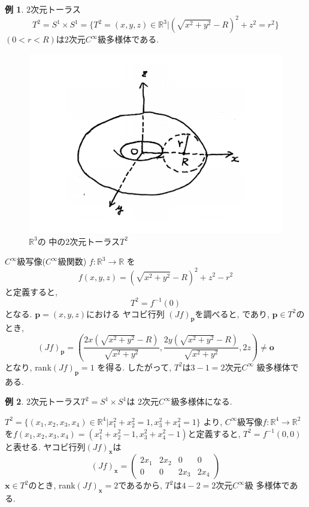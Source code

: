 \documentclass[dvipdfmx,cjk]{beamer}
\theoremstyle{definition}
\newtheorem{ex}{\textbf{ 例 }}
\begin{document}
\begin{frame}
  \frametitle{}
  \begin{ex}
    $2$次元トーラス
    $$T^2=S^1\times S^1=
    \{T^2=(x,y,z)\in \mathbb{R}^3|
    (\sqrt{x^2+y^2}-R)^2+z^2=r^2\} $$
    $(0<r<R)$は$2$次元$C^\infty$級多様体である. 
    \begin{figure}[H]
      \centering
      \includegraphics[keepaspectratio, scale=0.2]{T2Noshadow.pdf}
      \caption{$\mathbb{R}^3$の
      中の$2$次元トーラス$T^2$}
      \label{T2Noshadow}
     \end{figure}
\end{ex}
\end{frame}

\begin{frame}
    $C^\infty$級写像($C^\infty$級関数)
    $f:\mathbb{R}^3\to \mathbb{R}$
    を
    $$f(x,y,z)=(\sqrt{x^2+y^2}-R)^2+z^2-r^2$$
    と定義すると, 
    $$T^2=f^{-1}(0)$$
    となる. $\boldsymbol{p}=(x,y,z)$における
    ヤコビ行列
    $(Jf)_{\boldsymbol{p}}$を調べると, 
    であり, $\boldsymbol{p}\in T^2$のとき, 
    $$(Jf)_{\boldsymbol{p}}=
    \left(\frac{2x(\sqrt{x^2+y^2}-R)}
        {\sqrt{x^2+y^2}},\frac{2y(\sqrt{x^2+y^2}-R)}
        {\sqrt{x^2+y^2}},2z\right)\neq 
        \boldsymbol{o}$$
    となり, rank$(Jf)_{\boldsymbol{p}}=1$
    を得る. 
    したがって, $T^2$は$3-1=2$次元$C^\infty$
    級多様体である. 
\end{frame}

\begin{frame}
  \begin{ex}
    $2$次元トーラス$T^2=S^1\times S^1$は
    $2$次元$C^\infty$級多様体になる.  
  \end{ex}  
  $T^2=\{(x_1,x_2,x_3,x_4)\in \mathbb{R}^4|
  x_1^2+x_2^2=1, x_3^2+x_4^2=1\}$
  より, 
  $C^\infty$級写像$f:\mathbb{R}^4\to \mathbb{R}^2$
  を$f(x_1,x_2,x_3,x_4)=(x_1^2+x_2^2-1,
  x_3^2+x_4^2-1)$と定義すると, 
  $T^2=f^{-1}(0,0)$
  と表せる. ヤコビ行列$(Jf)_{\boldsymbol{x}}$は
  $$(Jf)_{\boldsymbol{x}}=
      \left(\begin{array}{cccc}
          2x_1&2x_2&0&0\\
          0&0&2x_3&2x_4
      \end{array}\right)$$
  $\boldsymbol{x}\in T^2$のとき, 
  rank$(Jf)_{\boldsymbol{x}}=2$であるから, 
  $T^2$は$4-2=2$次元$C^\infty$級
  多様体である.
\end{frame}
\end{document}
